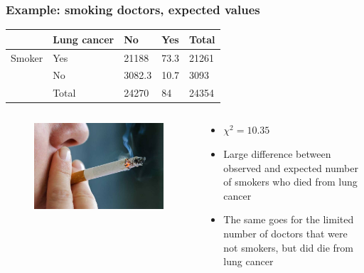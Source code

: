 \documentclass{beamer}
\begin{document}
\begin{frame}
  \frametitle{Example: smoking doctors, expected values}
  
\begin{table}[h]
\begin{tabular}{@{}lllll@{}}
\toprule
      & \textbf{Lung cancer} & \textbf{No} & \textbf{Yes} & \textbf{Total} \\ \midrule
Smoker & Yes                 & 21188         & 73.3         & 21261           \\
      & No                & 3082.3        & 10.7         & 3093            \\
      & Total              & 24270         & 84           & 24354           \\ \bottomrule
\end{tabular}
\end{table}

\begin{columns}
  \begin{column}{0.3 \textwidth}

  \begin{figure}
    \centering
      \includegraphics[width=1.00\textwidth]{img/les-6-smoking.jpg}
  \end{figure}

  \end{column}
  \begin{column}{0.7 \textwidth}

  \begin{itemize}
    \item $\chi^{2} = 10.35$
    \item Large difference between observed and expected number of smokers who died from lung cancer
    \item The same goes for the limited number of doctors that were not smokers, but did die from lung cancer
  \end{itemize}
  \end{column}
\end{columns}
\end{frame}
\end{document}
